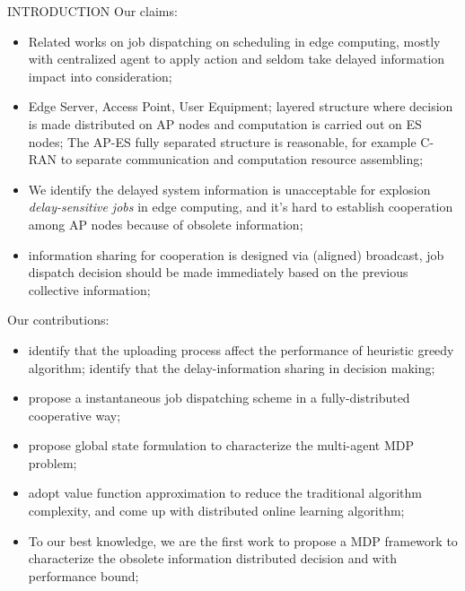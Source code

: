\documentclass[10pt, conference, letterpaper]{IEEEtran}
\begin{document}
    \begin{section}{INTRODUCTION}
        \label{sec:introduction}
        Our claims:
        \begin{itemize}
            \item Related works on job dispatching on scheduling in edge computing, mostly with centralized agent to apply action and seldom take delayed information impact into consideration;
            \item Edge Server, Access Point, User Equipment; layered structure where decision is made distributed on AP nodes and computation is carried out on ES nodes; The AP-ES fully separated structure is reasonable, for example C-RAN to separate communication and computation resource assembling;
            \item We identify the delayed system information is unacceptable for explosion \emph{delay-sensitive jobs} in edge computing, and it's hard to establish cooperation among AP nodes because of obsolete information;
            \item information sharing for cooperation is designed via (aligned) broadcast, job dispatch decision should be made immediately based on the previous collective information;
        \end{itemize}

        Our contributions:
        \begin{itemize}
            \item identify that the uploading process affect the performance of heuristic greedy algorithm; identify that the delay-information sharing in decision making;
            \item propose a instantaneous job dispatching scheme in a fully-distributed cooperative way;
            \item propose global state formulation to characterize the multi-agent MDP problem;
            \item adopt value function approximation to reduce the traditional algorithm complexity, and come up with distributed online learning algorithm;
            \item To our best knowledge, we are the first work to propose a MDP framework to characterize the obsolete information distributed decision and with performance bound;
        \end{itemize}


\end{section}
\end{document}
